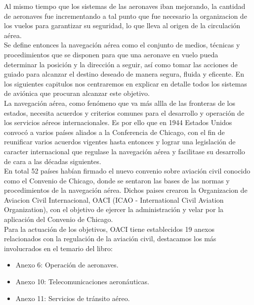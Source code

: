 Al mismo tiempo que los sistemas de las aeronaves iban mejorando, la cantidad de aeronaves fue incrementando a tal punto que fue necesario la organizacion de los vuelos para garantizar su seguridad, lo que lleva al origen de la circulación aérea.\\

Se define entonces la navegación aérea como el conjunto de medios, técnicas y procedimientos que se disponen para que una aeronave en vuelo pueda determinar la posición y la dirección a seguir, así como tomar las acciones de guiado para alcanzar el destino deseado de manera segura, fluida y eficente. En los siguientes capitulos nos centraremos en explicar en detalle todos los sistemas de aviónica que procuran alcanzar este objetivo.\\

La navegación aérea, como fenómeno que va más allla de las fronteras de los estados, necesita acuerdos y criterios comunes para el desarrollo y operación de los servicios aéreos internacionales. Es por ello que en 1944 Estados Unidos convocó a varios países aliados a la Conferencia de Chicago, con el fin de reunificar varios acuerdos vigentes hasta entonces y lograr una legislación de caracter internacional que regulase la navegación aérea y facilitase su desarrollo de cara a las décadas siguientes.\\

En total 52 países habían firmado el nuevo convenio sobre aviación civil conocido como el Convenio de Chicago, donde se sentaron las bases de las normas y procedimientos de la navegación aérea. Dichos paises crearon la Organizacion de Aviacion Civil Internacional, OACI (ICAO - International Civil Aviation Organization), con el objetivo de ejercer la administración y velar por la aplicación del Convenio de Chicago.\\
 
Para la actuación de los objetivos, OACI tiene establecidos 19 anexos relacionados con la regulación de la aviación civil, destacamos los más involucrados en el temario del libro:\\

\begin{itemize}
	\item Anexo 6: Operación de aeronaves.
	\item Anexo 10: Telecomunicaciones aeronáuticas.
	\item Anexo 11: Servicios de tránsito aéreo.\\
\end{itemize}
\newpage

